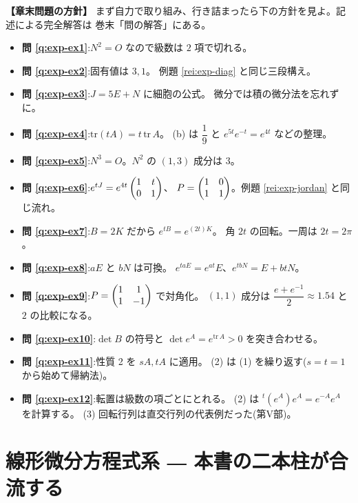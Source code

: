 \bigskip
{\small
\noindent\textbf{【章末問題の方針】}\quad
まず自力で取り組み、行き詰まったら下の方針を見よ。記述による完全解答は
巻末「問の解答」にある。
\begin{itemize}
\item \textbf{問 \ref{q:exp-ex1}}:$N^2 = O$ なので級数は $2$ 項で切れる。
\item \textbf{問 \ref{q:exp-ex2}}:固有値は $3, 1$。
例題 \ref{rei:exp-diag} と同じ三段構え。
\item \textbf{問 \ref{q:exp-ex3}}:$J = 5E + N$ に細胞の公式。
微分では積の微分法を忘れずに。
\item \textbf{問 \ref{q:exp-ex4}}:$\mathrm{tr}(tA) = t\,\mathrm{tr}\,A$。
(b) は $\dfrac{1}{9}$ と $e^{5t}e^{-t} = e^{4t}$ などの整理。
\item \textbf{問 \ref{q:exp-ex5}}:$N^3 = O$。$N^2$ の $(1,3)$ 成分は $3$。
\item \textbf{問 \ref{q:exp-ex6}}:$e^{tJ} = e^{4t}\begin{pmatrix}1 & t \\ 0 & 1\end{pmatrix}$、
$P = \begin{pmatrix}1 & 0 \\ 1 & 1\end{pmatrix}$。例題 \ref{rei:exp-jordan} と同じ流れ。
\item \textbf{問 \ref{q:exp-ex7}}:$B = 2K$ だから $e^{tB} = e^{(2t)K}$。
角 $2t$ の回転。一周は $2t = 2\pi$。
\item \textbf{問 \ref{q:exp-ex8}}:$aE$ と $bN$ は可換。
$e^{taE} = e^{at}E$、$e^{tbN} = E + btN$。
\item \textbf{問 \ref{q:exp-ex9}}:$P = \begin{pmatrix}1 & 1 \\ 1 & -1\end{pmatrix}$ で対角化。
$(1,1)$ 成分は $\dfrac{e + e^{-1}}{2} \approx 1.54$ と $2$ の比較になる。
\item \textbf{問 \ref{q:exp-ex10}}:$\det B$ の符号と
$\det e^{A} = e^{\mathrm{tr}\,A} > 0$ を突き合わせる。
\item \textbf{問 \ref{q:exp-ex11}}:性質 2 を $sA, tA$ に適用。
(2) は (1) を繰り返す($s = t = 1$ から始めて帰納法)。
\item \textbf{問 \ref{q:exp-ex12}}:転置は級数の項ごとにとれる。
(2) は ${}^t(e^{A})e^{A} = e^{-A}e^{A}$ を計算する。
(3) 回転行列は直交行列の代表例だった(第V部)。
\end{itemize}
}

\chapter{線形微分方程式系 ― 本書の二本柱が合流する}\label{chap:ode}

